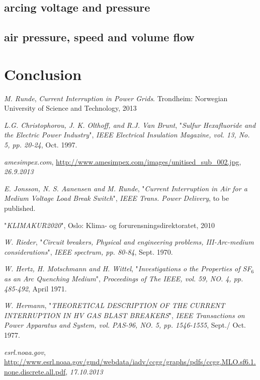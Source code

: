 \documentclass[10pt,a4paper]{article} %
\begin{document}
\subsection{arcing voltage and pressure}

\subsection{air pressure, speed and volume flow}
\newpage
\section{Conclusion}

\newpage
\begin{thebibliography}{10}


 \textit{M. Runde}, \textit{Current Interruption in Power Grids}. Trondheim: Norwegian University of Science and Technology, 2013

 \textit{L.G. Christophorou, J. K. Olthoff, and R.J. Van Brunt}, "\textit{Sulfur Hexafluoride and the Electric Power Industry}", \textit{IEEE Electrical Insulation Magazine, vol. 13, No. 5, pp. 20-24}, Oct. 1997.

 \textit{amesimpex.com}, \url{http://www.amesimpex.com/images/unitised_sub_002.jpg}, \textit{26.9.2013}

 \textit{E. Jonsson, N. S. Aanensen and M. Runde}, "\textit{Current Interruption in Air for a Medium Voltage Load Break Switch}", \textit{IEEE Trans. Power Delivery}, to be published.

 "\textit{KLIMAKUR2020}", Oslo: Klima- og forurensningsdirektoratet, 2010

 \textit{W. Rieder}, "\textit{Circuit breakers, Physical and engineering problems, III-Arc-medium considerations}", \textit{IEEE spectrum, pp. 80-84}, Sept. 1970.

 \textit{W. Hertz, H. Motschmann and H. Wittel}, "\textit{Investigations o the Properties of SF$_6$ as an Arc Quenching Medium}", \textit{Proceedings of The IEEE, vol. 59, NO. 4, pp. 485-492}, April 1971.

 \textit{W. Hermann}, "\textit{THEORETICAL DESCRIPTION OF THE CURRENT INTERRUPTION IN HV GAS BLAST BREAKERS}", \textit{IEEE Transactions on Power Apparatus and System, vol. PAS-96, NO. 5, pp. 1546-1555}, Sept./ Oct. 1977.

 \textit{esrl.noaa.gov}, \url{http://www.esrl.noaa.gov/gmd/webdata/iadv/ccgg/graphs/pdfs/ccgg.MLO.sf6.1.none.discrete.all.pdf}, \textit{17.10.2013}


\end{thebibliography}
\end{document}
